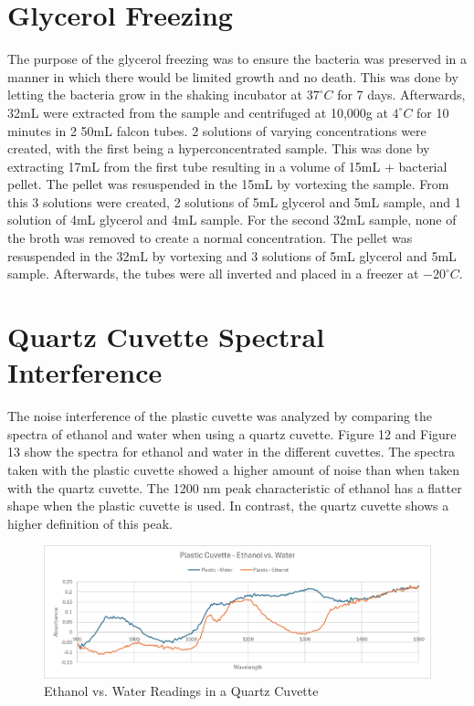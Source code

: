 \documentclass[12pt]{report}
\begin{document}
\section{Glycerol Freezing}
The purpose of the glycerol freezing was to ensure the bacteria was preserved in a manner in which there would be limited growth and no death. This was done by letting the bacteria grow in the shaking incubator at $37^{\circ}C$ for 7 days. Afterwards, 32mL were extracted from the sample and centrifuged at 10,000g at $4^{\circ}C$ for 10 minutes in 2 50mL falcon tubes. 2 solutions of varying concentrations were created, with the first being a hyperconcentrated sample. This was done by extracting 17mL from the first tube resulting in a volume of 15mL + bacterial pellet. The pellet was resuspended in the 15mL by vortexing the sample. From this 3 solutions were created, 2 solutions of 5mL glycerol and 5mL sample, and 1 solution of 4mL glycerol and 4mL sample. For the second 32mL sample, none of the broth was removed to create a normal concentration. The pellet was resuspended in the 32mL by vortexing and 3 solutions of 5mL glycerol and 5mL sample. Afterwards, the tubes were all inverted and placed in a freezer at $-20^{\circ}C$. 


\section{Quartz Cuvette Spectral Interference}
The noise interference of the plastic cuvette was analyzed by comparing the spectra of ethanol and water when using a quartz cuvette. Figure 12 and Figure 13 show the spectra for ethanol and water in the different cuvettes. The spectra taken with the plastic cuvette showed a higher amount of noise than when taken with the quartz cuvette. The 1200 nm peak characteristic of ethanol has a flatter shape when the plastic cuvette is used. In contrast, the quartz cuvette shows a higher definition of this peak.

\begin{figure}[!h]
    \centering
    \includegraphics[width=0.75\linewidth]{Images/plastic_ew.png}
    \caption{Ethanol vs. Water Readings in a Quartz Cuvette}
    \label{fig:app_plastic}
\end{figure}
\end{document}
